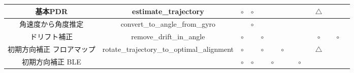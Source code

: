 \documentclass[Japanese]{dicomopapers}
\begin{document}
\begin{table}[ht]
{\begin{tabular}{|c|c|c|c|c|c|c|c|c|c|c|c|c|c|}
			基本PDR         & estimate\_trajectory                       & \multicolumn{1}{c|}{$\circ$} & \multicolumn{1}{c|}{$\circ$} &                              &                              &                              &                                                                                                               &                              &                              & \multicolumn{1}{c|}{$\triangle$} &    &                              &    \\ \hline
			角速度から角度推定     & convert\_to\_angle\_from\_gyro             &                              & \multicolumn{1}{c|}{$\circ$} &                              &                              &                              &                                                                                                               &                              &                              &                                  &    &                              &    \\ \hline
			ドリフト補正        & remove\_drift\_in\_angle                   & \multicolumn{1}{c|}{$\circ$} &                              & \multicolumn{1}{c|}{$\circ$} &                              &                              &                                                                                                               &                              &                              & \multicolumn{1}{c|}{$\circ$}     &    & \multicolumn{1}{c|}{$\circ$} &    \\ \hline
			初期方向補正 フロアマップ & rotate\_trajectory\_to\_optimal\_alignment & \multicolumn{1}{c|}{$\circ$} &                              & \multicolumn{1}{c|}{$\circ$} &                              & \multicolumn{1}{c|}{$\circ$} &                                                                                                               &                              &                              & \multicolumn{1}{c|}{$\triangle$} &    &                              &    \\ \hline
			初期方向補正 BLE    &                                            & \multicolumn{1}{c|}{$\circ$} & \multicolumn{1}{c|}{$\circ$} &                              & \multicolumn{1}{c|}{$\circ$} &                              &                                                                                                               & \multicolumn{1}{c|}{$\circ$} &                              &                                  &    &                              &    \\ \hline

\end{tabular}}
\end{table}
\end{document}
